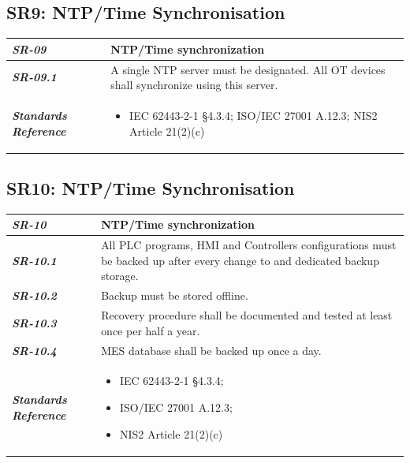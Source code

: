 \documentclass[11pt,a4paper]{article}
\begin{document}
\subsection{SR9: NTP/Time Synchronisation}\label{SR9}
\begin{tabularx}{\textwidth}{>{\bfseries}p{2.5cm} X}
    \textit{SR-09} & \textbf{NTP/Time synchronization} \vspace{0.5em}\\
\toprule
\textit{SR-09.1} &
    A single NTP server must be designated. All OT devices shall synchronize using this server.
    \vspace{0.5em}
\\
\midrule
    \textit{Standards Reference} &
\begin{itemize}[label=-, noitemsep, topsep=0pt, leftmargin=*]
    \item IEC 62443-2-1 §4.3.4; ISO/IEC 27001 A.12.3; NIS2 Article 21(2)(c)
\end{itemize} \vspace{1em} \\ 
\end{tabularx}
\vspace{2em}

\subsection{SR10: NTP/Time Synchronisation}\label{SR10}
\begin{tabularx}{\textwidth}{>{\bfseries}p{2.5cm} X}
    \textit{SR-10} & \textbf{NTP/Time synchronization} \vspace{0.5em}\\
\toprule
\textit{SR-10.1} &
    All PLC programs, HMI and Controllers configurations must be backed up after every change to and dedicated backup storage. 
    \vspace{0.5em}
\\
\textit{SR-10.2} &
    Backup must be stored offline.
    \vspace{0.5em}
\\
\textit{SR-10.3} &
    Recovery procedure shall be documented and tested at least once per half a year.
    \vspace{0.5em}
\\
\textit{SR-10.4} &
    MES database shall be backed up once a day.
    \vspace{0.5em}
\\
\midrule
    \textit{Standards Reference} &
\begin{itemize}[label=-, noitemsep, topsep=0pt, leftmargin=*]
    \item IEC 62443-2-1 §4.3.4; 
    \item ISO/IEC 27001 A.12.3; 
    \item NIS2 Article 21(2)(c)
\end{itemize} \vspace{1em} \\ 
\end{tabularx}
\vspace{2em}
\end{document}
